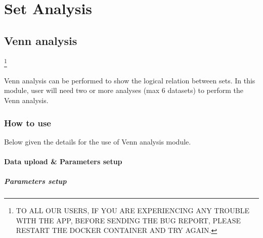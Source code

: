 \documentclass[
  a4paper,
  oneside,
  open=any]{scrreport}
\begin{document}
\part{Set Analysis}

\hypertarget{sec-venn}{%
\chapter{Venn analysis}\label{sec-venn}}

\footnote{TO ALL OUR USERS, IF YOU ARE EXPERIENCING ANY TROUBLE WITH THE
  APP, BEFORE SENDING THE BUG REPORT, PLEASE RESTART THE DOCKER
  CONTAINER AND TRY AGAIN.}

Venn analysis can be performed to show the logical relation between
sets. In this module, user will need two or more analyses (max 6
datasets) to perform the Venn analysis.

\hypertarget{how-to-use-9}{%
\section{How to use}\label{how-to-use-9}}

Below given the details for the use of Venn analysis module.

\hypertarget{data-upload-parameters-setup-6}{%
\subsection{Data upload \& Parameters
setup}\label{data-upload-parameters-setup-6}}

\hypertarget{parameters-setup-3}{%
\subsubsection{Parameters setup}\label{parameters-setup-3}}
\end{document}

